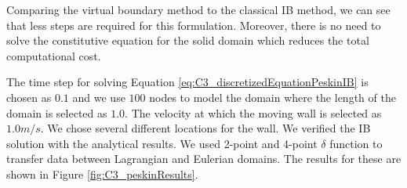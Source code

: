 Comparing the virtual boundary method to the classical IB method, we can see that less steps are required for this formulation. Moreover, there is no need to solve the constitutive equation for the solid domain which reduces the total computational cost.

The time step for solving Equation \eqref{eq:C3_discretizedEquationPeskinIB} is chosen as $0.1$ and we use $100$ nodes to model the domain where the length of the domain is selected as $1.0$. The velocity at which the moving wall is selected as $1.0 m/s$. We chose several different locations for the wall. We verified the IB solution with the analytical results. We used 2-point and 4-point $\delta$ function to transfer data between Lagrangian and Eulerian domains. The results for these are shown in Figure \ref{fig:C3_peskinResults}.

